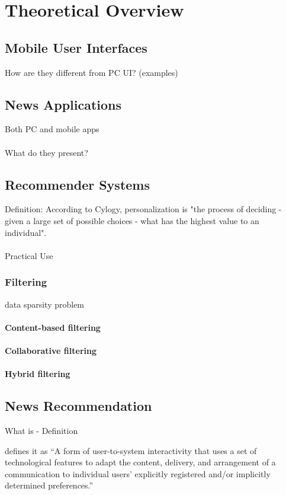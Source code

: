 \chapter{Theoretical Overview}

\section{Mobile User Interfaces}
How are they different from PC UI? (examples)


\section{News Applications}
Both PC and mobile apps
\\\\
What do they present?


\section{Recommender Systems}
Definition: According to Cylogy, personalization is "the process of deciding - given a large set of possible choices - what has the highest value to an individual"\cite{personalization_overview}.\\\\
Practical Use

\subsection{Filtering}
data sparsity problem

\subsubsection{Content-based filtering}

\subsubsection{Collaborative filtering}

\subsubsection{Hybrid filtering}

\section{News Recommendation}
What is - Definition

\cite{thurman2012future} defines it as “A form of user-to-system interactivity that uses a set of technological features to adapt the content, delivery, and arrangement of a communication to individual users’ explicitly registered and/or implicitly determined preferences.”